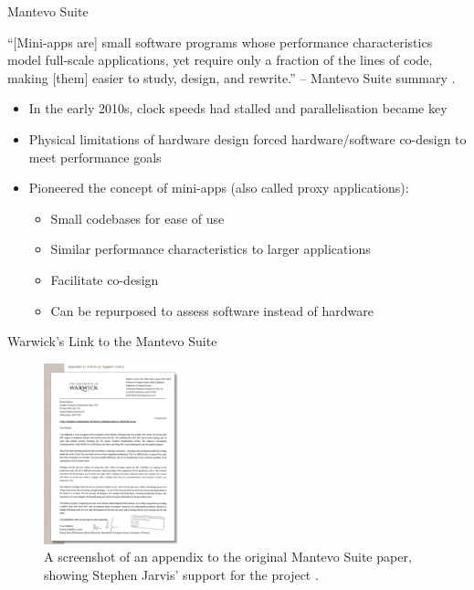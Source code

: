 \documentclass[10pt,aspectratio=169]{beamer}
\begin{document}
\begin{frame}{Mantevo Suite}
    \begin{displayquote}
        \vspace{0.2cm}
        ``[Mini-apps are] small software programs whose performance characteristics model full-scale applications, yet require only a fraction of the lines of code, making [them] easier to study, design, and rewrite.'' -- Mantevo Suite summary \cite{heroux2013mantevo}.
    \end{displayquote}
    \vspace*{0.25cm}
    \begin{itemize}
        \item In the early 2010s, clock speeds had stalled and parallelisation became key
        \item Physical limitations of hardware design forced hardware/software co-design to meet performance goals
        \item Pioneered the concept of mini-apps (also called proxy applications):
        \begin{itemize}
            \item Small codebases for ease of use
            \item Similar performance characteristics to larger applications
            \item Facilitate co-design
            \item \alert{Can be repurposed to assess software instead of hardware}
        \end{itemize}
    \end{itemize}
    
\end{frame}

\begin{frame}{Warwick's Link to the Mantevo Suite}
    \begin{figure}[H]
        \includegraphics[width=0.35\textwidth]{images/warwick_mantevo_link.png}
        \caption{A screenshot of an appendix to the original Mantevo Suite paper, showing Stephen Jarvis' support for the project \cite{heroux2013mantevo}.}
        \label{fig:warwick_mantevo_link}
    \end{figure}
\end{frame}
\end{document}
